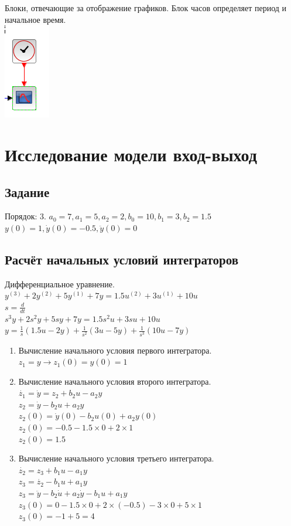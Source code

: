\documentclass[12pt, a4paper] {ncc}
\begin{document}
	Блоки, отвечающие за отображение графиков. Блок часов определяет период и начальное время. \\
	\includegraphics[scale=0.6]{plot.png}

\section{Исследование модели вход-выход}
    \subsection{Задание}
		Порядок: 3. $a_0 = 7, a_1 = 5, a_2 = 2, b_0 = 10, b_1 = 3, b_2 = 1.5$ \\
		$ y(0) = 1, \dot{y}(0) = -0.5, \ddot{y}(0) = 0$

	\subsection{Расчёт начальных условий интеграторов}

		Дифференциальное уравнение.\\
		$y^{(3)} + 2 y^{(2)} + 5 y^{(1)} + 7 y = 1.5 u^{(2)} + 3 u^{(1)} + 10 u $ \\
		$s = \frac{d} {d t}$ \\
		$s^3y + 2 s^2 y  + 5 s y + 7 y = 1.5 s^2 u + 3s u + 10 u$\\
		$y = \frac{1}{s} (1.5 u - 2 y ) + \frac{1}{s^2} (3 u - 5 y) + \frac{1}{s^3}(10 u - 7 y)$
		\begin{enumerate}
			\item Вычисление начального условия первого интегратора. \\
				  $z_1 = y \to z_1(0) = y(0) = 1 $
			\item Вычисление начального условия второго интегратора. \\
				  $\dot{z_1} = \dot{y} = z_2 + b_2 u - a_2 y$ \\
				  $z_2 = \dot{y} - b_2  u + a_2 y $ \\
				  $z_2(0) = \dot{y}(0) - b_2  u(0) + a_2 y(0) $ \\
				  $z_2(0) = -0.5 - 1.5 \times 0 + 2 \times 1$ \\
				  $z_2(0) = 1.5$
			\item Вычисление начального условия третьего интегратора. \\
				  $\dot{z_2} = z_3 + b_1 u - a_1 y $ \\
				  $z_3 = \dot{z_2} - b_1 u + a_1 y $ \\
				  $z_3 = \ddot{y} - b_2 \dot{u} + a_2 \dot{y} - b_1 u + a_1 y$ \\
				  $z_3(0) = 0 - 1.5 \times 0 + 2 \times (-0.5) - 3 \times 0 + 5 \times 1$ \\
				  $z_3(0) = -1 + 5 = 4$
		\end{enumerate}
\end{document}
